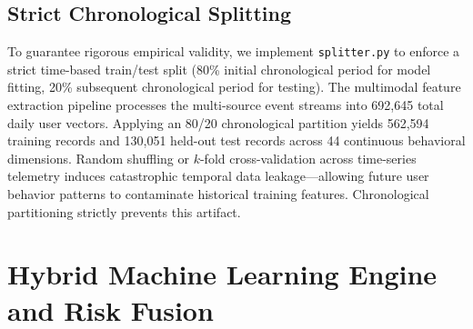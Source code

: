\documentclass[conference]{IEEEtran}
\begin{document}
\subsection{Strict Chronological Splitting}
To guarantee rigorous empirical validity, we implement \texttt{splitter.py} to enforce a strict time-based train/test split (80\% initial chronological period for model fitting, 20\% subsequent chronological period for testing). The multimodal feature extraction pipeline processes the multi-source event streams into 692,645 total daily user vectors. Applying an 80/20 chronological partition yields 562,594 training records and 130,051 held-out test records across 44 continuous behavioral dimensions. Random shuffling or $k$-fold cross-validation across time-series telemetry induces catastrophic temporal data leakage---allowing future user behavior patterns to contaminate historical training features. Chronological partitioning strictly prevents this artifact.

\section{Hybrid Machine Learning Engine and Risk Fusion}
\label{sec:models}
\end{document}
